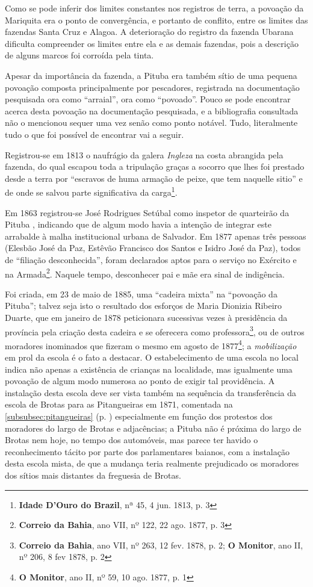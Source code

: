 Como se pode inferir dos limites constantes nos registros de terra, a povoação da Mariquita era o ponto de convergência, e portanto de conflito, entre os limites das fazendas Santa Cruz e Alagoa. A deterioração do registro da fazenda Ubarana dificulta compreender os limites entre ela e as demais fazendas, pois a descrição de alguns marcos foi corroída pela tinta.

Apesar da importância da fazenda, a Pituba era também sítio de uma pequena povoação composta principalmente por pescadores, registrada na documentação pesquisada ora como ``arraial'', ora como ``povoado''. Pouco se pode encontrar acerca desta povoação na documentação pesquisada, e a bibliografia consultada não o mencionou sequer uma vez senão como ponto notável. Tudo, literalmente tudo o que foi possível de encontrar vai a seguir.

Registrou-se em 1813 o naufrágio da galera \textit{Ingleza} na costa abrangida pela fazenda, do qual escapou toda a tripulação graças a socorro que lhes foi prestado desde a terra por ``escravos de huma armação de peixe, que tem naquelle sitio'' e de onde se salvou parte significativa da carga\footnote{\textbf{Idade D'Ouro do Brazil}, nª 45, 4 jun. 1813, p. 3}.

Em 1863 registrou-se José Rodrigues Setúbal como inspetor de quarteirão da Pituba \cite[p.~260]{masson_almanak_1863}, indicando que de algum modo havia a intenção de integrar este arrabalde à malha institucional urbana de Salvador. Em 1877 apenas três pessoas (Elesbão José da Paz, Estêvão Francisco dos Santos e Isidro José da Paz), todos de ``filiação desconhecida'', foram declarados aptos para o serviço no Exército e na Armada\footnote{\textbf{Correio da Bahia}, ano VII, nº 122, 22 ago. 1877, p. 3}. Naquele tempo, desconhecer pai e mãe era sinal de indigência.

Foi criada, em 23 de maio de 1885, uma ``cadeira mixta'' na ``povoação da Pituba''\cite[p.~126]{bahia_relatassleg_1886}; talvez seja isto o resultado dos esforços de Maria Dionizia Ribeiro Duarte, que em janeiro de 1878 peticionara sucessivas vezes à presidência da província pela criação desta cadeira e se oferecera como professora\footnote{\textbf{Correio da Bahia}, ano VII, nº 263, 12 fev. 1878, p. 2; \textbf{O Monitor}, ano II, nº 206, 8 fev 1878, p. 2}, ou de outros moradores inominados que fizeram o mesmo em agosto de 1877\footnote{\textbf{O Monitor}, ano II, nº 59, 10 ago. 1877, p. 1}; a \textit{mobilização} em prol da escola é o fato a destacar. O estabelecimento de uma escola no local indica não apenas a existência de crianças na localidade, mas igualmente uma povoação de algum modo numerosa ao ponto de exigir tal providência. A instalação desta escola deve ser vista também na sequência da transferência da escola de Brotas para as Pitangueiras em 1871, comentada na \autoref{subsubsec:pitangueiras} (p. \pageref{subsubsec:pitangueiras}) especialmente em função dos protestos dos moradores do largo de Brotas e adjacências; a Pituba não é próxima do largo de Brotas nem hoje, no tempo dos automóveis, mas parece ter havido o reconhecimento tácito por parte dos parlamentares baianos, com a instalação desta escola mista, de que a mudança teria realmente prejudicado os moradores dos sítios mais distantes da freguesia de Brotas.

